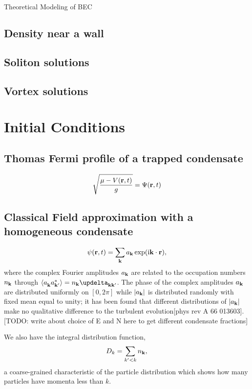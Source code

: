 \begin{chapter}{\label{cha:theoretical_model}Theoretical Modeling of BEC}
	\subsection{\label{section:wall} Density near a wall}
	\subsection{\label{section:soliton} Soliton solutions}
	\subsection{\label{section:vortices} Vortex solutions}
\section{\label{section:inital} Initial Conditions}
	\subsection{\label{section:tftrap} Thomas Fermi profile of a trapped condensate}
	\begin{equation}
	\sqrt{\frac{\mu - V({\bf r},t)}{g}} =  \Psi({\bf r},t)
	\label{eq:TF}
	\end{equation} 
	\subsection{\label{section:cfield} Classical Field approximation with a homogeneous condensate}
		\begin{equation}
		\psi({\bf r},t) = \sum_{\bf k} a_{\bf k} \exp (\mathrm{i}{\bf k}\cdot{\bf r}),
		\label{eq:cFieldIC}
		\end{equation}
		where the complex Fourier amplitudes $a_{\bf k}$ are related to the occupation numbers $n_{\bf k}$ through $\braket{a_{\bf k}^{\,}a_{\bf k'}^*} = n_{\bf k}\updelta_{\bf kk'}$. The phase of the complex amplitudes $a_{\bf k}$ are distributed uniformly on $[0,2\pi]$ while $|a_{\bf k}|$ is distributed randomly with fixed mean equal to unity; it has been found that different distributions of $|a_{\bf k}|$ make no qualitative difference to the turbulent evolution[phys rev A 66 013603]. [TODO: write about choice of E and N here to get different condensate fractions]

		We also have the integral distribution function,
		\begin{equation}
		D_k = \sum_{k'<k}n_{\bf k},
		\label{eq:intDistFunc}
		\end{equation}
		a coarse-grained characteristic of the particle distribution which shows how many particles have momenta less than $k$.
\end{chapter}